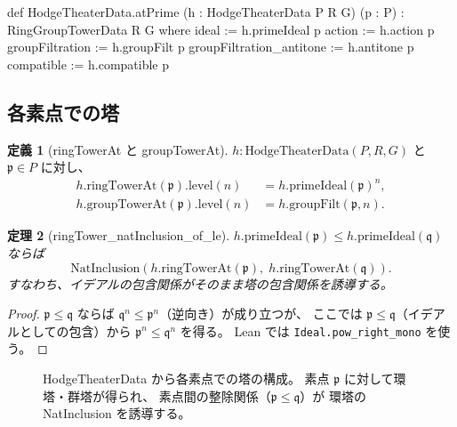 \documentclass[a4paper,11pt]{ltjsarticle}
\theoremstyle{definition}
\newtheorem{definition}{定義}[section]
\theoremstyle{plain}
\newtheorem{theorem}[definition]{定理}
\theoremstyle{remark}
\begin{document}
\begin{leancode}[caption={HodgeTheaterData の各素点への分解}]
def HodgeTheaterData.atPrime (h : HodgeTheaterData P R G) (p : P)
    : RingGroupTowerData R G where
  ideal               := h.primeIdeal p
  action              := h.action p
  groupFiltration     := h.groupFilt p
  groupFiltration_antitone := h.antitone p
  compatible          := h.compatible p
\end{leancode}

\subsection{各素点での塔}

\begin{definition}[ringTowerAt と groupTowerAt]
$h : \mathrm{HodgeTheaterData}(P, R, G)$ と $\mathfrak{p} \in P$ に対し、
\begin{align*}
  h.\mathrm{ringTowerAt}(\mathfrak{p}).\mathrm{level}(n) &= h.\mathrm{primeIdeal}(\mathfrak{p})^n, \\
  h.\mathrm{groupTowerAt}(\mathfrak{p}).\mathrm{level}(n) &= h.\mathrm{groupFilt}(\mathfrak{p}, n).
\end{align*}
\end{definition}

\begin{theorem}[ringTower\_natInclusion\_of\_le]
$h.\mathrm{primeIdeal}(\mathfrak{p}) \leq h.\mathrm{primeIdeal}(\mathfrak{q})$ ならば
\[
  \mathrm{NatInclusion}(h.\mathrm{ringTowerAt}(\mathfrak{p}),\; h.\mathrm{ringTowerAt}(\mathfrak{q})).
\]
すなわち、イデアルの包含関係がそのまま塔の包含関係を誘導する。
\end{theorem}

\begin{proof}
$\mathfrak{p} \leq \mathfrak{q}$ ならば $\mathfrak{q}^n \leq \mathfrak{p}^n$（逆向き）が成り立つが、
ここでは $\mathfrak{p} \leq \mathfrak{q}$（イデアルとしての包含）から
$\mathfrak{p}^n \leq \mathfrak{q}^n$ を得る。
Lean では \texttt{Ideal.pow\_right\_mono} を使う。
\end{proof}

\begin{figure}[H]
\centering
{}
\caption{HodgeTheaterData から各素点での塔の構成。
素点 $\mathfrak{p}$ に対して環塔・群塔が得られ、
素点間の整除関係（$\mathfrak{p} \leq \mathfrak{q}$）が
環塔の NatInclusion を誘導する。}
\label{fig:hodge}
\end{figure}
\end{document}
